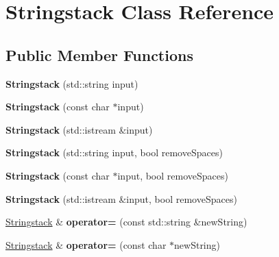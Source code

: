 \hypertarget{classStringstack}{\section{Stringstack Class Reference}
\label{classStringstack}
}
\subsection*{Public Member Functions}
\begin{DoxyCompactItemize}
\item 
\hypertarget{classStringstack_aad1e45b6c7f4992135b1eff99c4fb96b}{{\bfseries Stringstack} (std\-::string input)}\label{classStringstack_aad1e45b6c7f4992135b1eff99c4fb96b}

\item 
\hypertarget{classStringstack_a6951276915a18f6581fa2fe1f233130f}{{\bfseries Stringstack} (const char $\ast$input)}\label{classStringstack_a6951276915a18f6581fa2fe1f233130f}

\item 
\hypertarget{classStringstack_a340cb8b0e983570d65548a6c49736569}{{\bfseries Stringstack} (std\-::istream \&input)}\label{classStringstack_a340cb8b0e983570d65548a6c49736569}

\item 
\hypertarget{classStringstack_a964c8db56fa0bc1337fbde2c11456fdc}{{\bfseries Stringstack} (std\-::string input, bool remove\-Spaces)}\label{classStringstack_a964c8db56fa0bc1337fbde2c11456fdc}

\item 
\hypertarget{classStringstack_af26bb77483c372e9c27d145e1cfe4f8d}{{\bfseries Stringstack} (const char $\ast$input, bool remove\-Spaces)}\label{classStringstack_af26bb77483c372e9c27d145e1cfe4f8d}

\item 
\hypertarget{classStringstack_a60d383777a7789d2a3d7f6b901a755da}{{\bfseries Stringstack} (std\-::istream \&input, bool remove\-Spaces)}\label{classStringstack_a60d383777a7789d2a3d7f6b901a755da}

\item 
\hypertarget{classStringstack_a2197bda2738d2f687f4b90575b1bf7e1}{\hyperlink{classStringstack}{Stringstack} \& {\bfseries operator=} (const std\-::string \&new\-String)}\label{classStringstack_a2197bda2738d2f687f4b90575b1bf7e1}

\item 
\hypertarget{classStringstack_ab46ad119cb84606eaed0654bde436542}{\hyperlink{classStringstack}{Stringstack} \& {\bfseries operator=} (const char $\ast$new\-String)}\label{classStringstack_ab46ad119cb84606eaed0654bde436542}


\end{DoxyCompactItemize}
